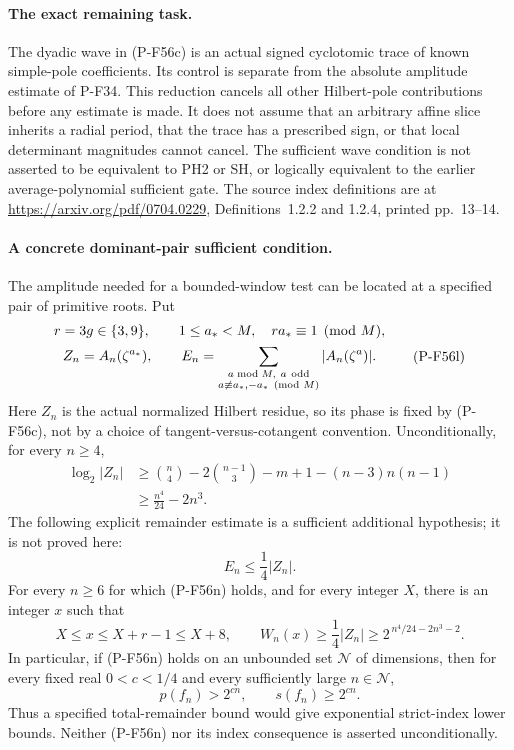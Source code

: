 \paragraph{The exact remaining task.}
The dyadic wave in (P-F56c) is an actual signed cyclotomic
trace of known simple-pole coefficients. Its control is
separate from the absolute amplitude estimate of P-F34.
This reduction cancels all other Hilbert-pole contributions
before any estimate is made. It does not assume that an
arbitrary affine slice inherits a radial period, that the
trace has a prescribed sign, or that local determinant
magnitudes cannot cancel. The sufficient wave condition
is not asserted to be equivalent to PH2 or SH, or logically
equivalent to the earlier average-polynomial sufficient gate.
The source index definitions are at
\url{https://arxiv.org/pdf/0704.0229},
Definitions~1.2.2 and 1.2.4, printed pp.~13--14.

\paragraph{A concrete dominant-pair sufficient condition.}
The amplitude needed for a bounded-window test can be located at a
specified pair of primitive roots. Put
\[
 \begin{gathered}
 r=3g\in\{3,9\},\qquad
 1\le a_*<M,\quad ra_*\equiv1\pmod M,\\
 Z_n=A_n(\zeta^{a_*}),\qquad
 E_n=\sum_{\substack{a\bmod M,\ a\ {\rm odd}\\
                         a\not\equiv a_*,-a_*\pmod M}}
                              |A_n(\zeta^a)|.
 \end{gathered}
 \tag{P-F56l}
\]
Here $Z_n$ is the actual normalized Hilbert residue, so its phase
is fixed by (P-F56c), not by a choice of tangent-versus-cotangent
convention. Unconditionally, for every $n\ge4$,
\[
 \begin{split}
 \log_2|Z_n|
 &\ge \binom n4-2\binom{n-1}3-m+1-(n-3)n(n-1)\\
 &\ge \frac{n^4}{24}-2n^3.
 \end{split}
 \tag{P-F56m}
\]
The following explicit remainder estimate is a sufficient
additional hypothesis; it is not proved here:
\[
                         E_n\le\frac14|Z_n|.
 \tag{P-F56n}
\]
For every $n\ge6$ for which (P-F56n) holds, and for every integer
$X$, there is an integer $x$ such that
\[
 X\le x\le X+r-1\le X+8,\qquad
 W_n(x)\ge\frac14|Z_n|
             \ge 2^{\,n^4/24-2n^3-2}.
 \tag{P-F56o}
\]
In particular, if (P-F56n) holds on an unbounded set
$\mathcal N$ of dimensions, then for every fixed real
$0<c<1/4$ and every sufficiently large $n\in\mathcal N$,
\[
                      p(f_n)>2^{cn},
             \qquad  s(f_n)\ge2^{cn}.
 \tag{P-F56p}
\]
Thus a specified total-remainder bound would give exponential
strict-index lower bounds. Neither (P-F56n) nor its index
consequence is asserted unconditionally.

